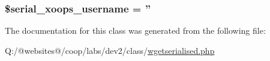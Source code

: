 \hypertarget{class_w_g_e_t_s_e_r_i_a_l_i_s_e_d_xortify_exchange_a276a5744b88de586eb05b0dce0f6873d}{
\subsubsection[{\$serial\-\_\-xoops\-\_\-username}]{\setlength{\rightskip}{0pt plus 5cm}\$serial\-\_\-xoops\-\_\-username = ''}}\label{class_w_g_e_t_s_e_r_i_a_l_i_s_e_d_xortify_exchange_a276a5744b88de586eb05b0dce0f6873d}


The documentation for this class was generated from the following file\-:\begin{DoxyCompactItemize}
\item 
Q\-:/@websites@/coop/labs/dev2/class/\hyperlink{wgetserialised_8php}{wgetserialised.\-php}\end{DoxyCompactItemize}
